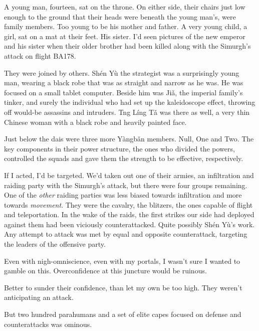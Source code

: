 A young man, fourteen, sat on the throne.  On either side, their chairs just low enough to the ground that their heads were beneath the young man's, were family members.  Too young to be his mother and father.  A very young child, a girl, sat on a mat at their feet.  His sister.  I'd seen pictures of the new emperor and his sister when their older brother had been killed along with the Simurgh's attack on flight BA178.



They were joined by others.  Sh\'{e}n Y\`{u} the strategist was a surprisingly young man, wearing a black robe that was as straight and narrow as he was.  He was focused on a small tablet computer.  Beside him was Ji\v{a}, the imperial family's tinker, and surely the individual who had set up the kaleidoscope effect, throwing off would-be assassins and intruders.  Tng L\'{i}ng T\v{a} was there as well, a very thin Chinese woman with a black robe and heavily painted face.



Just below the dais were three more Y\`{a}ngb\v{a}n members.  Null, One and Two.  The key components in their power structure, the ones who divided the powers, controlled the squads and gave them the strength to be effective, respectively.



If I acted, I'd be targeted.  We'd taken out one of their armies, an infiltration and raiding party with the Simurgh's attack, but there were four groups remaining.  One of the \emph{other} raiding parties was less biased towards infiltration and more towards \emph{movement}.  They were the cavalry, the blitzers, the ones capable of flight and teleportation.  In the wake of the raids, the first strikes our side had deployed against them had been viciously counterattacked.  Quite possibly Sh\'{e}n Y\`{u}'s work.  Any attempt to attack was met by equal and opposite counterattack, targeting the leaders of the offensive party.



Even with nigh-omniscience, even with my portals, I wasn't sure I wanted to gamble on this.  Overconfidence at this juncture would be ruinous.



Better to sunder their confidence, than let my own be too high.  They weren't anticipating an attack.



But two hundred parahumans and a set of elite capes focused on defense and counterattacks was ominous.



